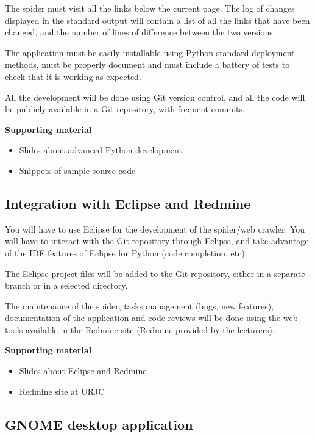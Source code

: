 \documentclass[a4paper]{article}
\begin{document}
The spider must visit all the links below the current page. The log of
changes displayed in the standard output will contain a list of all
the links that have been changed, and the number of lines of
difference between the two versions.

The application must be easily installable using Python standard
deployment methods, must be properly document and must include a
battery of tests to check that it is working as expected.

All the development will be done using Git version control, and all
the code will be publicly available in a Git repository, with frequent
commits.

\textbf{Supporting material}

\begin{itemize}
\item Slides about advanced Python development
\item Snippets of sample source code
\end{itemize}

\subsection{Integration with Eclipse and Redmine}
\label{sub:eclipse}

You will have to use Eclipse for the development of the spider/web
crawler. You will have to interact with the Git repository through
Eclipse, and take advantage of the IDE features of Eclipse for Python
(code completion, etc).

The Eclipse project files will be added to the Git repository, either
in a separate branch or in a selected directory.

The maintenance of the spider, tasks management (bugs, new features),
documentation of the application and code reviews will be done using
the web tools available in the Redmine site (Redmine provided by the
lecturers).

\textbf{Supporting material}

\begin{itemize}
\item Slides about Eclipse and Redmine
\item Redmine site at URJC
\end{itemize}


\subsection{GNOME desktop application}
\label{sub:gnome}
\end{document}
